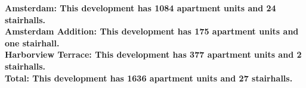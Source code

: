 \bf{Amsterdam}: This development has 1084 apartment units and 24 stairhalls.\\\bf{Amsterdam Addition}: This development has 175 apartment units and one stairhall.\\\bf{Harborview Terrace}: This development has 377 apartment units and 2 stairhalls.\\\bf{Total}: This development has 1636 apartment units and 27 stairhalls.\\
